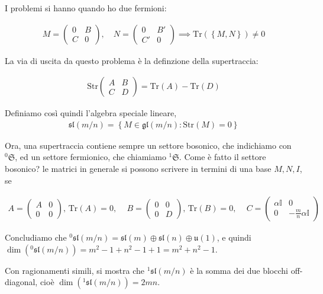 \documentclass{report}
\begin{document}
{    I problemi si hanno quando ho due fermioni: 

    \begin{align}
        M = \begin{pmatrix}
            0 & B \\ C & 0 
        \end{pmatrix}, \quad N = \begin{pmatrix}
            0 & B' \\ C' & 0 
        \end{pmatrix} \implies \text{Tr}(\left\{M, N\right\}) \neq 0 
    \end{align}

    La via di uscita da questo problema è la definzione della supertraccia: 

    \begin{align}
        \text{Str}\begin{pmatrix}
            A & B \\ C & D 
        \end{pmatrix} = \text{Tr}(A) - \text{Tr}(D)
    \end{align}

    Definiamo così quindi l'algebra speciale lineare, 
    \begin{align}
        \mathfrak{sl}(m/n) = \left\{M \in \mathfrak{gl}(m/n) : \text{Str}(M) = 0 \right\}
    \end{align}

    Ora, una supertraccia contiene sempre un settore bosonico, che indichiamo con \({}^0\mathfrak{S}\), ed un settore fermionico, che chiamiamo \({}^1\mathfrak{S}\). Come è fatto il settore bosonico? le matrici in generale si possono scrivere in termini di una base \(M, N, I\), se 

    \begin{align}
        A = \begin{pmatrix}
            A & 0 \\ 0 & 0 
        \end{pmatrix}, \, \text{Tr}(A) = 0, \,  \quad B = \begin{pmatrix}
            0 & 0 \\ 0 & D
        \end{pmatrix}, \, \text{Tr}(B) = 0, \, \quad C = \begin{pmatrix}
            \alpha \mathbb{I} & 0 \\ 
            0 & -\frac{m}{n}\alpha \mathbb{I}
        \end{pmatrix}
    \end{align}

    Concludiamo che \({}^0 \mathfrak{sl}(m/n) = \mathfrak{sl}(m)\oplus \mathfrak{sl}(n)\oplus \mathfrak{u}(1)\), e quindi \(\dim({}^0 \mathfrak{sl}(m/n)) = m^2 -1 + n^2 -1 +1 = m^2 +n^2 -1\). 

    Con ragionamenti simili, si mostra che \({}^1\mathfrak{sl}(m/n)\) è la somma dei due blocchi off-diagonal, cioè \(\dim({}^1 \mathfrak{sl}(m/n)) = 2mn\). 
}
\end{document}
